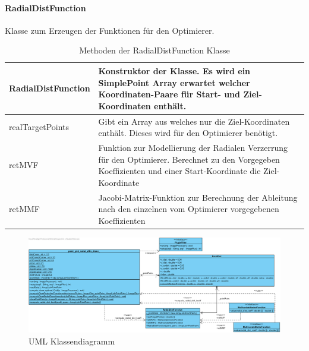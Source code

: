 \paragraph{RadialDistFunction}
Klasse zum Erzeugen der Funktionen für den Optimierer.

\begin{table}[H]
	\begin{tabular}{|p{} | p{}|} 
		\hline
		RadialDistFunction & Konstruktor der Klasse. Es wird ein SimplePoint Array erwartet welcher Koordinaten-Paare für Start- und Ziel-Koordinaten enthält.\\ \hline
		realTargetPoints & Gibt ein Array aus welches nur die Ziel-Koordinaten enthält. Dieses wird für den Optimierer benötigt.\\ \hline
		retMVF & Funktion zur Modellierung der Radialen Verzerrung für den Optimierer. Berechnet zu den Vorgegeben Koeffizienten und einer Start-Koordinate die Ziel-Koordinate\\ \hline
		retMMF & Jacobi-Matrix-Funktion zur Berechnung der Ableitung nach den einzelnen vom Optimierer vorgegebenen Koeffizienten \\ 
		\hline
	\end{tabular}
	\caption{Methoden der RadialDistFunction Klasse}
\end{table}

\begin{figure}[H]
	\center
	\includegraphics[height=\textheight]{Images/Class Diagram1.png}
	\caption{UML Klassendiagramm}
	\label{img:UML}
\end{figure}
